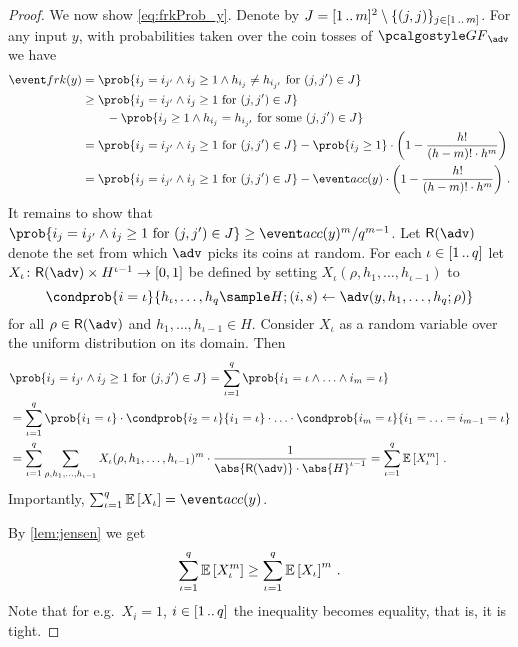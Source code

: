 \let\accentvec\vec \documentclass[runningheads,10pt]{llncs}
\begin{document}
\begin{proof}
	We now show \cref{eq:frkProb_y}.
	Denote by $J = [1 \, .. \, m]^2 \setminus \{(j, j)\}_{j \in [1 \, .. \, m]}$. 
	For any input $y$, with probabilities taken over the coin tosses of $\genforking_\adv$ we have
	\begin{align*}
		\frkProb (y) & = \prob{i_j = i_{j'} \land i_j \geq 1 \land h_{i_j} \neq h_{i_{j'}} \text{ for } (j, j') \in J}	\\
		& \geq \prob{i_j = i_{j'} \land i_j \geq 1 \text{ for } (j, j') \in J} \\
		& \qquad - \prob{i_j \geq 1 \land h_{i_j} = h_{i_{j'}} \text{ for some } (j, j') \in J}\\
		& = \prob{i_j = i_{j'} \land i_j \geq 1 \text{ for } (j, j') \in J} -
		\prob{i_j \geq 1} \cdot 
		\left(1 - \frac{h!}{(h - m)! \cdot h^m}\right) \\ 
		& = \prob{i_j = i_{j'} \land
		i_j \geq 1 \text{ for } (j, j') \in J} - \accProb(y) \cdot \left(1 - \frac{h!}{(h - m)! \cdot h^m}\right)\,.
	\end{align*}
	It remains to show that $\prob{i_j = i_{j'} \land i_j \geq 1 \text{ for } (j, j') \in J} \geq \infrac{\accProb(y)^m}{q^{m - 1}}$.
	Let $\RND{\adv}$ denote the set from which $\adv$ picks its coins at random.
	For each $\iota \in [1 \, .. \, q]$ let $X_\iota \colon \RND{\adv} \times
	H^{\iota - 1} \to [0, 1]$ be defined by setting $X_\iota(\rho, h_1, \ldots,
h_{\iota - 1})$ to \[
		\condprob{i = \iota}{h_\iota, \ldots, h_q \sample H; (i, s) \gets \adv(y, h_1, \ldots, h_q; \rho)} 
	\] 
	for all $\rho \in \RND{\adv}$ and $h_1, \ldots, h_{\iota - 1} \in H$. Consider $X_\iota$ as a random variable over the uniform distribution on its domain. 
	Then
	\begin{align*}
		& \prob{i_j = i_{j'} \land i_j \geq 1 \text{ for } (j, j') \in J} 
		 = \sum_{\iota = 1}^{q} \prob{i_1 = \iota \land \ldots \land i_m = \iota} \\
		& = \sum_{\iota = 1}^{q} \prob{i_1 = \iota} \cdot \condprob{i_2 = \iota}{i_1 = \iota} \cdot \ldots \cdot \condprob{i_m = \iota}{i_1 = \ldots = i_{m - 1} = \iota} \\
		& = \sum_{\iota = 1}^{q} \sum_{\rho, h_1, \ldots, h_{\iota - 1}} X_{\iota} (\rho, h_1, \ldots, h_{\iota - 1})^{m} \cdot \frac{1}{\abs{\RND{\adv}} \cdot \abs{H}^{\iota - 1}}
		= \sum_{\iota = 1}^{q} \expected{X_\iota^m} \,.
	\end{align*}
	Importantly, $\sum_{\iota = 1}^q \expected{X_{\iota}} = \accProb(y)$.
	
	By \cref{lem:jensen} we get
	\[
		\sum_{\iota = 1}^{q} \mathbb{E}\left[X_\iota^m\right] \geq \sum_{\iota = 1}^{q} \mathbb{E}\left[X_\iota\right]^m\,.
	\]
	Note that for e.g.~$X_i = 1$, $i \in [1 \, .. \, q]$ the inequality becomes equality, that is, it is tight.
	 

\end{proof}
\end{document}
